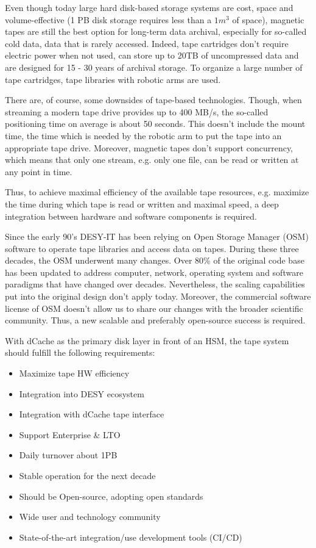 \documentclass{webofc}
\begin{document}
Even though today large hard disk-based storage systems are cost, space and volume-effective (1 PB disk storage requires less than a ${1m^{3}}$ of space),
magnetic tapes are still the best option for long-term data archival, especially for so-called cold data, data that is rarely accessed.
Indeed, tape cartridges don't require electric power when not used, can store up to 20TB of uncompressed data and are designed for
15 - 30 years of archival storage. To organize a large number of tape cartridges, tape libraries with robotic arms are used.

There are, of course, some downsides of tape-based technologies. Though, when streaming a modern tape drive provides up to 400 MB/s,
the so-called positioning time on average is about 50 seconds. This doesn't include the mount time, the time which is needed by the
robotic arm to put the tape into an appropriate tape drive. Moreover, magnetic tapes don't support concurrency, which means that only
one stream, e.g. only one file, can be read or written at any point in time.

Thus, to achieve maximal efficiency of the available tape resources, e.g. maximize the time during which tape is read or written and
maximal speed, a deep integration between hardware and software components is required.

Since the early 90's DESY-IT has been relying on Open Storage Manager (OSM) software to operate tape libraries and access data on tapes.
During these three decades, the OSM underwent many changes. Over 80\% of the original code base has been updated to address computer, network,
operating system and software paradigms that have changed over decades. Nevertheless, the scaling capabilities put into the original design
don't apply today. Moreover, the commercial software license of OSM doesn't allow us to share our changes with the broader scientific community.
Thus, a new scalable and preferably open-source success is required.

With dCache as the primary disk layer in front of an HSM, the tape system should fulfill the following requirements:

\begin{itemize}
    \item Maximize tape HW efficiency
    \item Integration into DESY ecosystem
    \item Integration with dCache tape interface
    \item Support Enterprise \& LTO
    \item Daily turnover about 1PB
    \item Stable operation for the next decade
    \item Should be Open-source, adopting open standards
    \item Wide user and technology community
    \item State-of-the-art integration/use development tools (CI/CD)
\end{itemize}
\end{document}
